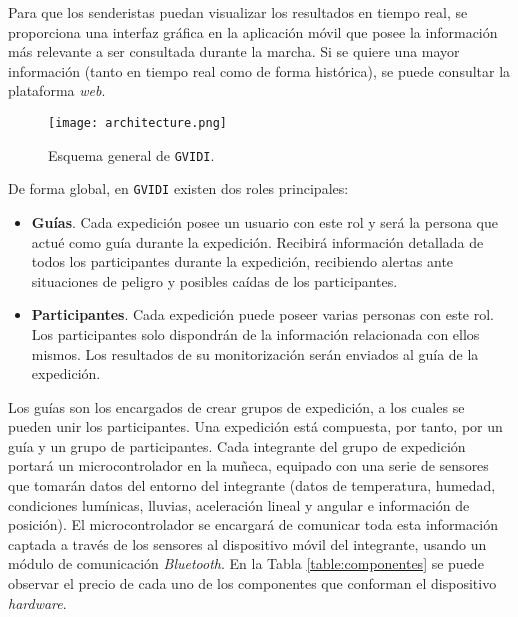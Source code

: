 Para que los senderistas puedan visualizar los resultados en tiempo real, se proporciona una interfaz gráfica en la aplicación móvil que posee la información más relevante a ser consultada durante la marcha. Si se quiere una mayor información (tanto en tiempo real como de forma histórica), se puede consultar la plataforma \textit{web}.

\begin{figure}[!h]
\begin{center}
\texttt{[image: architecture.png]}
\caption{Esquema general de \texttt{GVIDI}.}
\label{fig:esquema}
\end{center}
\end{figure}

De forma global, en \texttt{GVIDI} existen dos roles principales: 

\begin{itemize}
\item \textbf{Guías}. Cada expedición posee un usuario con este rol y será la persona que actué como guía durante la expedición. Recibirá información detallada de todos los participantes durante la expedición, recibiendo alertas ante situaciones de peligro y posibles caídas de los participantes.
\item \textbf{Participantes}. Cada expedición puede poseer varias personas con este rol. Los participantes solo dispondrán de la información relacionada con ellos mismos. Los resultados de su monitorización serán enviados al guía de la expedición.
\end{itemize}

Los guías son los encargados de crear grupos de expedición, a los cuales se pueden unir los participantes. Una expedición está compuesta, por tanto, por un guía y un grupo de participantes. Cada integrante del grupo de expedición portará un microcontrolador en la muñeca, equipado con una serie de sensores que tomarán datos del entorno del integrante (datos de temperatura, humedad, condiciones lumínicas, lluvias, aceleración lineal y angular e información de posición). El microcontrolador se encargará de comunicar toda esta información captada a través de los sensores al dispositivo móvil del integrante, usando un módulo de comunicación \textit{Bluetooth}. En la Tabla \ref{table:componentes} se puede observar el precio de cada uno de los componentes que conforman el dispositivo \textit{hardware}.

